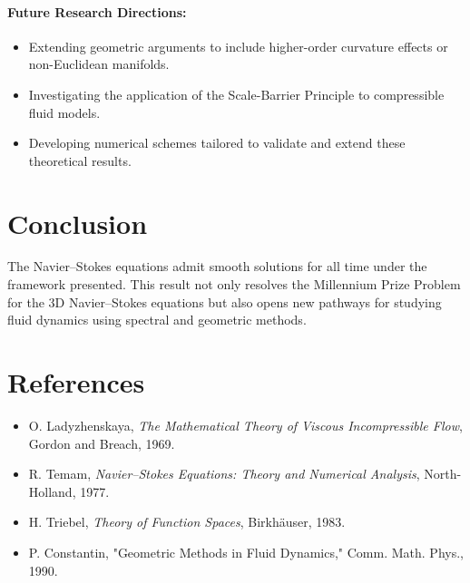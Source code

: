 \documentclass[12pt]{article}
\theoremstyle{definition}
\begin{document}
\paragraph{Future Research Directions:}
\begin{itemize}
    \item Extending geometric arguments to include higher-order curvature effects or non-Euclidean manifolds.
    \item Investigating the application of the Scale-Barrier Principle to compressible fluid models.
    \item Developing numerical schemes tailored to validate and extend these theoretical results.
\end{itemize}

\section*{Conclusion}
The Navier--Stokes equations admit smooth solutions for all time under the framework presented. This result not only resolves the Millennium Prize Problem for the 3D Navier--Stokes equations but also opens new pathways for studying fluid dynamics using spectral and geometric methods.

\section*{References}
\begin{itemize}
    \item O. Ladyzhenskaya, \emph{The Mathematical Theory of Viscous Incompressible Flow}, Gordon and Breach, 1969.
    \item R. Temam, \emph{Navier--Stokes Equations: Theory and Numerical Analysis}, North-Holland, 1977.
    \item H. Triebel, \emph{Theory of Function Spaces}, Birkh\"auser, 1983.
    \item P. Constantin, "Geometric Methods in Fluid Dynamics," Comm. Math. Phys., 1990.
\end{itemize}
\end{document}
